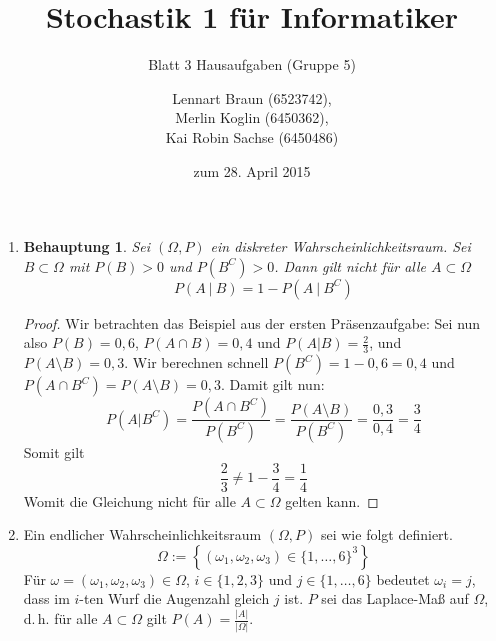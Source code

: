 \documentclass[a4paper]{scrartcl}
\title{Stochastik 1 für Informatiker}
\subtitle{Blatt 3 Hausaufgaben (Gruppe 5)}
\author{
    Lennart Braun (6523742), \\
    Merlin Koglin (6450362), \\
    Kai Robin Sachse (6450486)
}
\date{zum 28. April 2015}
\newtheorem*{behaupt}{Behauptung}
\begin{document}
\maketitle

\begin{enumerate}[label=\bfseries\arabic*.]
    \item
        \begin{behaupt}
            Sei $(\Omega, P)$ ein diskreter Wahrscheinlichkeitsraum.
            Sei $B \subset \Omega$ mit $P(B) > 0$ und $P(B^C) > 0$.
            Dann gilt nicht für alle $A \subset \Omega$
            \begin{equation*}
                P(A\ |\ B) = 1 - P(A\ |\ B^C)
            \end{equation*}
        \end{behaupt}
        \begin{proof}
            Wir betrachten das Beispiel aus der ersten Präsenzaufgabe: Sei nun also $P(B)=0,6$, $P(A\cap B)=0,4$ und 
            $P(A|B)=\frac{2}{3}$, und $P(A\setminus B)=0,3$. 
            Wir berechnen schnell $P(B^C)=1-0,6=0,4$ und $P(A\cap B^C)=P(A\setminus B)=0,3$. Damit gilt nun:
            \[P(A|B^C)=\frac{P(A\cap B^C)}{P(B^C)}=\frac{P(A\setminus B)}{P(B^C)}=\frac{0,3}{0,4}=\frac{3}{4}\]
            Somit gilt 
            \[\frac{2}{3}\ne 1-\frac{3}{4}=\frac{1}{4}\]
            Womit die Gleichung nicht für alle $A\subset\Omega$ gelten kann. 
        \end{proof}

    \item
        Ein endlicher Wahrscheinlichkeitsraum $(\Omega, P)$ sei wie folgt
        definiert.
        \begin{equation*}
            \Omega := \left\{ (\omega_1, \omega_2, \omega_3)
                \in \{1, \ldots, 6\}^3 \right\}
        \end{equation*}
        Für $\omega = (\omega_1, \omega_2, \omega_3) \in \Omega$,
        $i \in \{1, 2, 3\}$ und $j \in \{1, \ldots, 6\}$ bedeutet
        $\omega_i = j$, dass im $i$-ten Wurf die Augenzahl gleich $j$ ist.
        $P$ sei das Laplace-Maß auf $\Omega$, d.\,h. für alle $A \subset \Omega$
        gilt $P(A) = \frac{|A|}{|\Omega|}$.


\end{enumerate}
\end{document}
